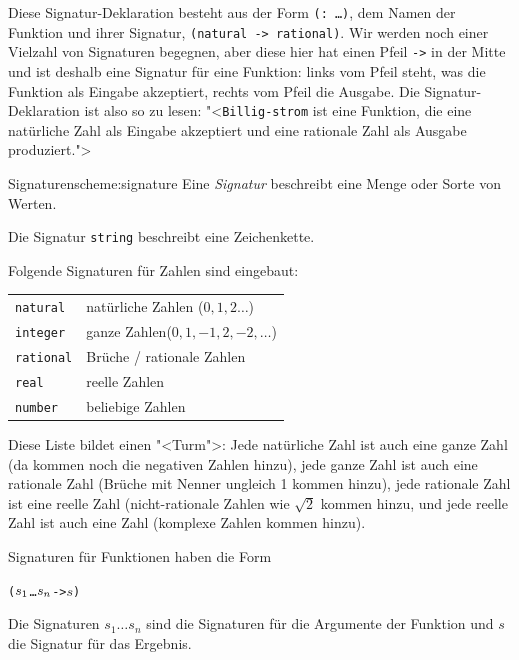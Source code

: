 Diese Signatur-Deklaration besteht aus der Form \texttt{(: \ldots)},
dem Namen der Funktion und ihrer Signatur, \texttt{(natural ->
  rational)}.  Wir werden noch einer Vielzahl von Signaturen begegnen,
aber diese hier hat einen Pfeil \texttt{->} in der Mitte und ist
deshalb eine Signatur für eine Funktion: links vom Pfeil steht, was
die Funktion als Eingabe akzeptiert, rechts vom Pfeil die Ausgabe. Die
Signatur-Deklaration ist also so zu lesen: "<\texttt{Billig-strom} ist
eine Funktion, die eine natürliche Zahl als Eingabe akzeptiert und
eine rationale Zahl als Ausgabe produziert.">

\begin{feature}{Signaturen}{scheme:signature}
  Eine \textit{Signatur} beschreibt eine Menge oder
  Sorte von Werten.

  \smallskip
  Die Signatur \texttt{string}
  beschreibt eine Zeichenkette.
  \smallskip
  
  Folgende Signaturen für Zahlen sind eingebaut:
  \begin{flushleft}
    \begin{tabular}{ll}
      \texttt{natural\index{natural@\texttt{natural}}} & natürliche
                                                         Zahlen\index{natürliche
                                                         Zahlen} ($0, 1, 2\ldots$)\\
      \texttt{integer\index{integer@\texttt{integer}}} & ganze
                                                         Zahlen\index{ganze
                                                         Zahlen}($0, 1, -1, 2, -2, \ldots$)\\
      \texttt{rational\index{rational@\texttt{rational}}} &
                                                            Brüche\index{Bruch} / rationale Zahlen\index{rationale Zahlen} \\
      \texttt{real\index{real@\texttt{real}}} & reelle
                                                Zahlen\index{reelle Zahlen}\\
      \texttt{number\index{number@\texttt{number}}} & beliebige Zahlen
    \end{tabular}
  \end{flushleft}
  Diese Liste bildet einen "<Turm">: Jede natürliche Zahl ist auch eine
  ganze Zahl (da kommen noch die negativen Zahlen hinzu), jede ganze
  Zahl ist auch eine rationale Zahl (Brüche mit Nenner ungleich 1
  kommen hinzu), jede rationale Zahl ist eine reelle Zahl
  (nicht-rationale Zahlen wie $\sqrt{2}$ kommen hinzu, und jede reelle
  Zahl ist auch eine Zahl (komplexe Zahlen kommen hinzu).

\smallskip
  
  Signaturen für Funktionen haben die Form
%
\begin{alltt}
(\(s\sb{1}\) \ldots \(s\sb{n}\) -> \(s\))
\end{alltt}
%
Die Signaturen $s_1 \ldots s_n$ sind die Signaturen für die Argumente
der Funktion und $s$ die Signatur für das Ergebnis.
\end{feature}

